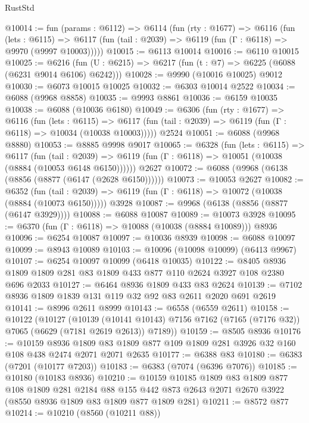 \begin{lexlean}{RustStd}
\begin{coremodule}
@10014 := fun (params : @6112) =>
  @6114
    (fun (rty : @1677) =>
    @6116
      (fun (lets : @6115) =>
      @6117 (fun (tail : @2039) => @6119 (fun (Γ : @6118) => @9970 (@9997 @10003)))))
@10015 := @6113 @10014
@10016 := @6110 @10015
@10025 := @6216 (fun (U : @6215) => @6217 (fun (t : @7) => @6225 (@6088 (@6231 @9014 @6106) @6242)))
@10028 := @9990 (@10016 @10025) @9012
@10030 := @6073 @10015 @10025
@10032 := @6303 @10014 @2522
@10034 := @6088 (@9968 @8858)
@10035 := @9993 @8861
@10036 := @6159 @10035
@10038 := @6088 (@10036 @6180)
@10049 := @6306
    (fun (rty : @1677) =>
    @6116
      (fun (lets : @6115) =>
      @6117 (fun (tail : @2039) => @6119 (fun (Γ : @6118) => @10034 (@10038 @10003)))))
    @2524
@10051 := @6088 (@9968 @8880)
@10053 := @8885 @9998 @9017
@10065 := @6328
    (fun (lets : @6115) =>
    @6117
      (fun (tail : @2039) =>
      @6119 (fun (Γ : @6118) => @10051 (@10038 (@8884 (@10053 @6148 @6150))))))
    @2627
@10072 := @6088 (@9968 (@6138 (@8856 (@8877 (@6147 (@2628 @6150))))))
@10073 := @10053 @2627
@10082 := @6352
    (fun (tail : @2039) => @6119 (fun (Γ : @6118) => @10072 (@10038 (@8884 (@10073 @6150)))))
    @3928
@10087 := @9968 (@6138 (@8856 (@8877 (@6147 @3929))))
@10088 := @6088 @10087
@10089 := @10073 @3928
@10095 := @6370 (fun (Γ : @6118) => @10088 (@10038 (@8884 @10089))) @8936
@10096 := @6254 @10087
@10097 := @10036 @8939
@10098 := @6088 @10097
@10099 := @8943 @10089
@10103 := @10096 (@10098 @10099) (@6413 @9967)
@10107 := @6254 @10097 @10099 (@6418 @10035)
@10122 := @8405 @8936 @1809 @1809 @281 @83 @1809 @433 @877 @110 @2624 @3927 @108 @2380 @696 @2033
@10127 := @6464 @8936 @1809 @433 @83 @2624
@10139 := @7102 @8936 @1809 @1839 @131 @119 @32 @92 @83 @2611 @2020 @691 @2619
@10141 := @8996 @2611 @8999
@10143 := @6558 (@6559 @2611)
@10158 := @10122
    (@10127
      (@10139
        (@10141 @10143)
        @7156
        @7162
        (@7165 (@7176 @32))
        @7065
        (@6629 (@7181 @2619 @2613))
        @7189))
@10159 := @8505 @8936
@10176 := @10159
    @8936
    @1809
    @83
    @1809
    @877
    @109
    @1809
    @281
    @3926
    @32
    @160
    @108
    @438
    @2474
    @2071
    @2071
    @2635
@10177 := @6388 @83
@10180 := @6383 (@7201 (@10177 @7203))
@10183 := @6383 (@7074 (@6396 @7076))
@10185 := @10180 (@10183 @8936)
@10210 := @10159
    @10185
    @1809
    @83
    @1809
    @877
    @108
    @1809
    @281
    @2184
    @88
    @155
    @442
    @873
    @2643
    @2071
    @2670
    @3922
    (@8550 @8936 @1809 @83 @1809 @877 @1809 @281)
@10211 := @8572 @877
@10214 := @10210 (@8560 (@10211 @88))

\end{coremodule}
\end{lexlean}
